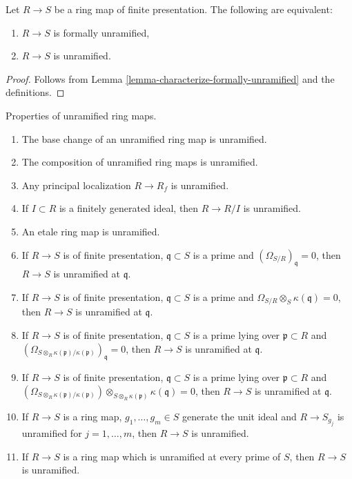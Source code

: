 \begin{lemma}
\label{lemma-formally-unramified-unramified}
Let $R \to S$ be a ring map of finite presentation.
The following are equivalent:
\begin{enumerate}
\item $R \to S$ is formally unramified,
\item $R \to S$ is unramified.
\end{enumerate}
\end{lemma}

\begin{proof}
Follows from Lemma \ref{lemma-characterize-formally-unramified}
and the definitions.
\end{proof}

\begin{lemma}
\label{lemma-unramified}
Properties of unramified ring maps.
\begin{enumerate}
\item The base change of an unramified ring map is unramified.
\item The composition of unramified ring maps is unramified.
\item Any principal localization $R \to R_f$ is unramified.
\item If $I \subset R$ is a finitely generated ideal, then
$R \to R/I$ is unramified.
\item An etale ring map is unramified.
\item If $R \to S$ is of finite presentation, $\mathfrak q \subset S$
is a prime and $(\Omega_{S/R})_{\mathfrak q} = 0$, then
$R \to S$ is unramified at $\mathfrak q$.
\item If $R \to S$ is of finite presentation, $\mathfrak q \subset S$
is a prime and $\Omega_{S/R} \otimes_S \kappa(\mathfrak q) = 0$, then
$R \to S$ is unramified at $\mathfrak q$.
\item If $R \to S$ is of finite presentation, $\mathfrak q \subset S$
is a prime lying over $\mathfrak p \subset R$ and
$(\Omega_{S \otimes_R \kappa(\mathfrak p)/\kappa(\mathfrak p)})_{\mathfrak q}
= 0$, then $R \to S$ is unramified at $\mathfrak q$.
\item If $R \to S$ is of finite presentation, $\mathfrak q \subset S$
is a prime lying over $\mathfrak p \subset R$ and
$(\Omega_{S \otimes_R \kappa(\mathfrak p)/\kappa(\mathfrak p)})
\otimes_{S \otimes_R \kappa(\mathfrak p)} \kappa(\mathfrak q) = 0$,
then $R \to S$ is unramified at $\mathfrak q$.
\item If $R \to S$ is a ring map, $g_1, \ldots, g_m \in S$ generate
the unit ideal and $R \to S_{g_j}$ is unramified for
$j = 1, \ldots, m$, then $R \to S$ is unramified.
\item If $R \to S$ is a ring map which is unramified at every prime
of $S$, then $R \to S$ is unramified.
\end{enumerate}
\end{lemma}

